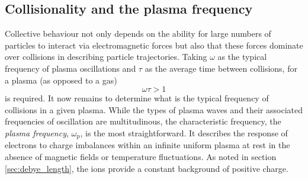 \subsection{\label{sec:plasma_frequency}Collisionality and the plasma frequency}
Collective behaviour not only depends on the ability for large numbers of particles to interact via electromagnetic forces but also that these forces dominate over collisions in describing particle trajectories. Taking $\omega$ as the typical frequency of plasma oscillations and $\tau$ as the average time between collisions, for a plasma (as opposed to a gas)
\begin{equation}\label{eq:plasma_frequency_condition}
	\omega\tau > 1
\end{equation}
is required. It now remains to determine what is the typical frequency of collisions in a given plasma. While the types of plasma waves and their associated frequencies of oscillation are multitudinous, the characteristic frequency, the \textit{plasma frequency}, $\omega_\mathrm{p}$, is the most straightforward. It describes the response of electrons to charge imbalances within an infinite uniform plasma at rest in the absence of magnetic fields or temperature fluctuations. As noted in section \ref{sec:debye_length}, the ions provide a constant background of positive charge.

